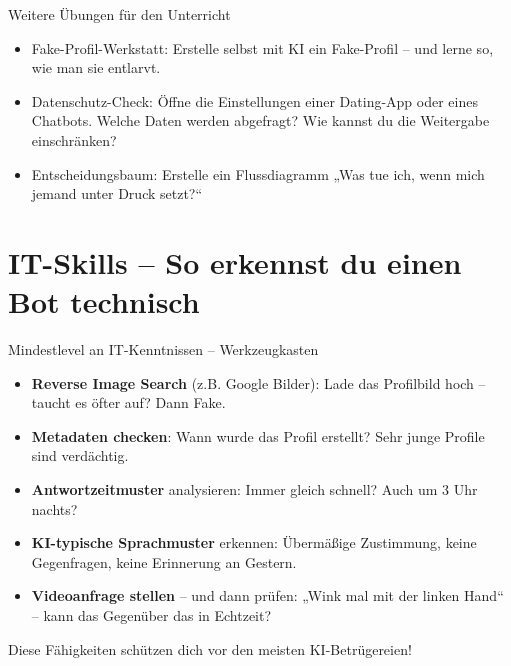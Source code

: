 \documentclass[10pt,aspectratio=169]{beamer}
\begin{document}
	\begin{frame}{Weitere Übungen für den Unterricht}
		\begin{itemize}
			\item \alert{Fake-Profil-Werkstatt:} Erstelle selbst mit KI ein Fake-Profil – und lerne so, wie man sie entlarvt.
			\item \alert{Datenschutz-Check:} Öffne die Einstellungen einer Dating-App oder eines Chatbots. Welche Daten werden abgefragt? Wie kannst du die Weitergabe einschränken?
			\item \alert{Entscheidungsbaum:} Erstelle ein Flussdiagramm „Was tue ich, wenn mich jemand unter Druck setzt?“
		\end{itemize}
	\end{frame}
	
	\section{IT-Skills – So erkennst du einen Bot technisch}
	\begin{frame}{Mindestlevel an IT-Kenntnissen – Werkzeugkasten}
		\begin{itemize}
			\item \textbf{Reverse Image Search} (z.B. Google Bilder): Lade das Profilbild hoch – taucht es öfter auf? Dann Fake.
			\item \textbf{Metadaten checken}: Wann wurde das Profil erstellt? Sehr junge Profile sind verdächtig.
			\item \textbf{Antwortzeitmuster} analysieren: Immer gleich schnell? Auch um 3 Uhr nachts?
			\item \textbf{KI-typische Sprachmuster} erkennen: Übermäßige Zustimmung, keine Gegenfragen, keine Erinnerung an Gestern.
			\item \textbf{Videoanfrage stellen} – und dann prüfen: „Wink mal mit der linken Hand“ – kann das Gegenüber das in Echtzeit?
		\end{itemize}
		\alert{Diese Fähigkeiten schützen dich vor den meisten KI-Betrügereien!}
	\end{frame}
	
\end{document}

